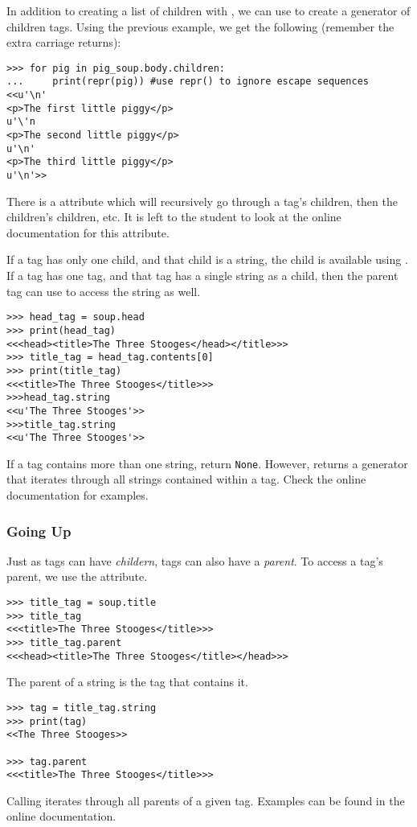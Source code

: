 In addition to creating a list of children with , we can use  to create a generator of children tags.
Using the previous example, we get the following (remember the extra carriage returns):
\begin{lstlisting}
>>> for pig in pig_soup.body.children:
...     print(repr(pig)) #use repr() to ignore escape sequences
<<u'\n'
<p>The first little piggy</p>
u'\'n
<p>The second little piggy</p>
u'\n'
<p>The third little piggy</p>
u'\n'>>
\end{lstlisting}

There is a  attribute which will recursively go through a tag's children, then the children's children, etc.
It is left to the student to look at the online documentation for this attribute.

If a tag has only one child, and that child is a string, the child is available using .
If a tag has one tag, and that tag has a single string as a child, then the parent tag can use  to access the string as well.
\begin{lstlisting}
>>> head_tag = soup.head
>>> print(head_tag)
<<<head><title>The Three Stooges</head></title>>>
>>> title_tag = head_tag.contents[0]
>>> print(title_tag)
<<<title>The Three Stooges</title>>>
>>>head_tag.string
<<u'The Three Stooges'>>
>>>title_tag.string
<<u'The Three Stooges'>>
\end{lstlisting}
If a tag contains more than one string,  return \lstinline{None}.
However,  returns a generator that iterates through all strings contained within a tag.
Check the online documentation for examples.

\subsubsection{Going Up}

Just as tags can have \textit{childern}, tags can also have a \textit{parent}.
To access a tag's parent, we use the  attribute.
\begin{lstlisting}
>>> title_tag = soup.title
>>> title_tag
<<<title>The Three Stooges</title>>>
>>> title_tag.parent
<<<head><title>The Three Stooges</title></head>>>
\end{lstlisting}
The parent of a string is the tag that contains it.
\begin{lstlisting}
>>> tag = title_tag.string
>>> print(tag)
<<The Three Stooges>>

>>> tag.parent
<<<title>The Three Stooges</title>>>
\end{lstlisting}
Calling  iterates through all parents of a given tag. Examples can be found in the online documentation.

